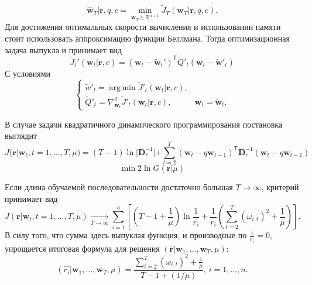 \documentclass[12pt, twoside]{article}
\DeclareMathOperator*{\argmin}{arg\,min}
\begin{document}
\begin{equation}
\hat{\textbf{w}}_{T}|\textbf{r}, q, c = \underset{\textbf{w}_T \in \mathbb{R}^{n+1}}\min \widetilde{J}_T(\textbf{w}_T|\textbf{r},q,c).
\end{equation}
Для достижения оптимальных скорости вычисления и использовании памяти стоит использовать аппроксимацию функции Беллмана. Тогда оптимизационная задача выпукла и принимает вид
\begin{equation}
\widetilde{J}_t'(\textbf{w}_t|\textbf{r},c) = (\textbf{w}_t - \widetilde{\textbf{w}}_t')^{\mathsf{T}}\widetilde{Q}'_t(\textbf{w}_t - \widetilde{\textbf{w}}'_t)
\end{equation}
С условиями
\begin{equation}
\begin{cases}
\widetilde{w}'_t = \argmin \widetilde{J}'_t(\textbf{w}_t|\textbf{r}, c), \\
\widetilde{Q}'_t = \nabla^2_{\textbf{w}_t}\widetilde{J}'_t(\textbf{w}_t|\textbf{r},c),& \textbf{w}_t = \widetilde{\textbf{w}}_t.
\end{cases}
\end{equation}

В случае задачи квадратичного динамического программирования постановка выглядит
\begin{equation}
J(\textbf{r}|\textbf{w}_t, t = 1,\ldots,T, \mu) = (T-1)\ln|\textbf{D}^{-1}_r| + \sum_{t=2}^T(\textbf{w}_t - q\textbf{w}_{t-1})^{\mathsf{T}}\textbf{D}^{-1}_r(\textbf{w}_t - q\textbf{w}_{t-1})
\end{equation}
\begin{equation}
\min 2\ln G(\textbf{r}|\mu)
\end{equation}

Если длина обучаемой последовательности достаточно большая $T \rightarrow \infty$, критерий принимает вид 
\begin{equation}
J(\textbf{r}|\textbf{w}_t, t=1,\ldots,T,\mu) \underset{T \rightarrow \infty}{\rightarrow} \sum_{i=1}^n\left[\left(T - 1 + \frac{1}{\mu}\right)\ln\frac{1}{r_i} + \frac{1}{r_i}\left(\sum_{t = 2}^T(\omega_{i,t})^2 + \frac{1}{\mu}\right)\right].
\end{equation}
В силу того, что сумма здесь выпуклая функция, и производные по $\frac{1}{r_i} = 0$, упрощается итоговая формула для решения $(\hat{\textbf{r}}|\textbf{w}_1, \ldots  ,\textbf{w}_T, \mu)$:
\begin{equation}
(\hat{r_i}|\textbf{w}_1, \ldots, \textbf{w}_T, \mu) = \frac{\sum_{t=2}^T(\omega_{i,t})^2 + \frac{1}{\mu}}{T - 1 + (1/\mu)},\, i=1,\ldots,n.  
\end{equation}
\end{document}

